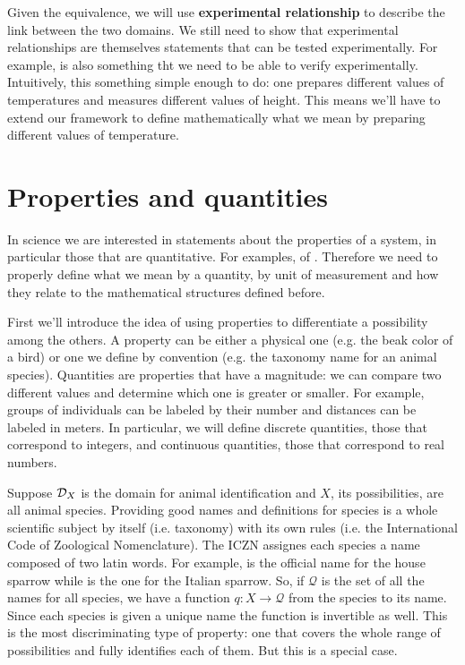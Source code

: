 \documentclass[11pt,letterpaper,fleqn]{memoir} %
\begin{document}
Given the equivalence, we will use \textbf{experimental relationship} to describe the link between the two domains. We still need to show that experimental relationships are themselves statements that can be tested experimentally. For example,  is also something tht we need to be able to verify experimentally. Intuitively, this something simple enough to do: one prepares different values of temperatures and measures different values of height. This means we'll have to extend our framework to define mathematically what we mean by preparing different values of temperature.

\section{Properties and quantities}

In science we are interested in statements about the properties of a system, in particular those that are quantitative. For examples,  of . Therefore we need to properly define what we mean by a quantity, by unit of measurement and how they relate to the mathematical structures defined before.

First we'll introduce the idea of using properties to differentiate a possibility among the others. A property can be either a physical one (e.g. the beak color of a bird) or one we define by convention (e.g. the taxonomy name for an animal species). Quantities are properties that have a magnitude: we can compare two different values and determine which one is greater or smaller. For example, groups of individuals can be labeled by their number and distances can be labeled in meters. In particular, we will define discrete quantities, those that correspond to integers, and continuous quantities, those that correspond to real numbers.

Suppose $\mathcal{D}_X$ is the domain for animal identification and $X$, its possibilities, are all animal species. Providing good names and definitions for species is a whole scientific subject by itself (i.e. taxonomy) with its own rules (i.e. the International Code of Zoological Nomenclature). The ICZN assignes each species a name composed of two latin words. For example,  is the official name for the house sparrow while  is the one for the Italian sparrow. So, if $\mathcal{Q}$ is the set of all the names for all species, we have a function $q: X \to \mathcal{Q}$ from the species to its name. Since each species is given a unique name the function is invertible as well. This is the most discriminating type of property: one that covers the whole range of possibilities and fully identifies each of them. But this is a special case.
\end{document}
